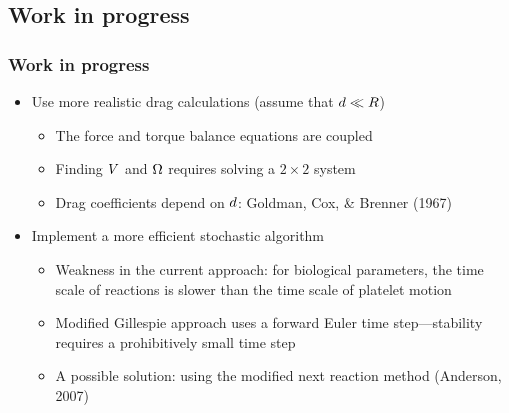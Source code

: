 \documentclass{beamer}
\begin{document}
\subsection{Work in progress}

\begin{frame}
  \frametitle{Work in progress}
  \begin{itemize}
  \item Use more realistic drag calculations (assume that
    $d \ll R$)
    \begin{itemize}
    \item The force and torque balance equations are coupled
    \item Finding $V$ and $\Omega$ requires solving a
      $2\times2$ system
    \item Drag coefficients depend on $d$: Goldman, Cox, \&
      Brenner (1967)
    \end{itemize}
    \vfill
  \item Implement a more efficient stochastic algorithm
    \begin{itemize}
    \item Weakness in the current approach: for biological parameters,
      the time scale of reactions is slower than the time scale of
      platelet motion
    \item Modified Gillespie approach uses a forward Euler time
      step---stability requires a prohibitively small time step
    \item A possible solution: using the modified next reaction method
      (Anderson, 2007)
    \end{itemize}

  \end{itemize}
\end{frame}
\end{document}

